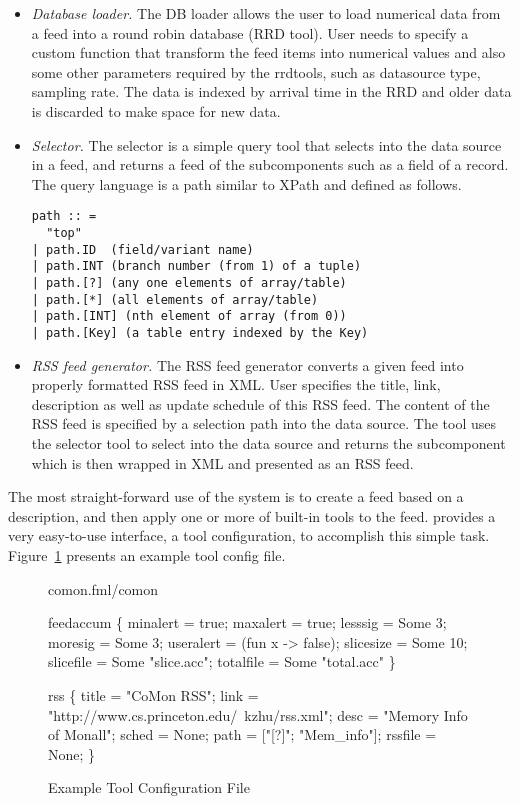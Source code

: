 \begin{itemize}
\item {\em Database loader.} The DB loader allows the user to load numerical
data from a feed into a round robin database (RRD tool). User needs to specify
a custom function that transform the feed items into numerical values
and also some other parameters required by the rrdtools, such as datasource
type, sampling rate. The data is indexed by arrival time in the RRD and
older data is discarded to make space for new data.

\item {\em Selector.} The selector is a simple query tool that selects
into the data source in a feed, and returns a feed of the subcomponents 
such as a field of a record. The query language is a path similar to XPath
and defined as follows.

{\small
\begin{verbatim}
path :: =  
  "top"
| path.ID  (field/variant name)
| path.INT (branch number (from 1) of a tuple)
| path.[?] (any one elements of array/table) 
| path.[*] (all elements of array/table) 
| path.[INT] (nth element of array (from 0))
| path.[Key] (a table entry indexed by the Key)
\end{verbatim}
}

\item {\em RSS feed generator.} The RSS feed generator converts a given
\padsd{} feed into properly formatted RSS feed in XML. User specifies
the title, link, description as well as update schedule of this RSS feed.
The content of the RSS feed is specified by a selection path into
the data source. The tool uses the selector tool to
select into the data source and returns the subcomponent which is then
wrapped in XML and presented as an RSS feed.
\end{itemize}

The most straight-forward use of the \padsd{} system is to create a feed 
based on a \padsd{} description, and then apply one or more of built-in tools 
to the feed. \padsd{} provides a very 
easy-to-use interface, a tool configuration, to accomplish this simple task. 
Figure~\ref{fig:toolconfigs} presents an example tool config file.

\begin{figure}[tb]
\centering
\begin{codebox}
 comon.fml/comon

 feedaccum
\{
  minalert  = true;
  maxalert  = true;
  lesssig   = Some 3;
  moresig   = Some 3;
  useralert = (fun x -> false);
  slicesize = Some 10;
  slicefile = Some "slice.acc";
  totalfile = Some "total.acc"
\}

 rss
\{
  title = "CoMon RSS";
  link  = "http://www.cs.princeton.edu/~kzhu/rss.xml";
  desc  = "Memory Info of Monall";
  sched = None; 
  path  = ["[?]"; "Mem_info"];
  rssfile = None; 
\}
\end{codebox}
\caption{Example Tool Configuration File}
\label{fig:toolconfigs}
\end{figure}

